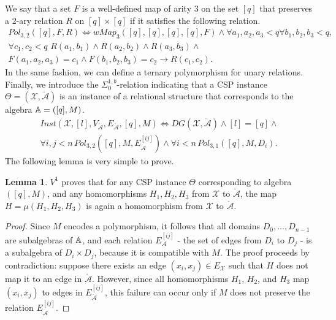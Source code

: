 \documentclass{article}
\newcommand{\A}{\ensuremath\mathbb{A}}
\theoremstyle{definition}
\theoremstyle{theorem}
\newtheorem{lem}{Lemma}
\theoremstyle{theorem}
\theoremstyle{remark}
\theoremstyle{remark}
\theoremstyle{example}
\theoremstyle{notation}
\theoremstyle{theorem}
\begin{document}
We say that a set $F$ is a well-defined map of arity $3$ on the set $[q]$ that preserves a $2$-ary relation $R$ on $[q] \times [q]$ if it satisfies the following relation.
\begin{equation}
 \begin{gathered}
 Pol_{3,2}([q], F, R) \iff wMap_3([q],[q],[q],[q],F) \wedge \forall a_1,a_2,a_3<q\forall b_1,b_2,b_3<q, \\
 \hspace{0pt}\forall c_1,c_2<q\,\,R(a_1,b_1)\wedge R(a_2,b_2) \wedge R(a_3,b_3) \wedge\\
 \hspace{0pt}F(a_1,a_2,a_3)=c_1\wedge F(b_1,b_2,b_3)=c_2 \rightarrow R(c_1,c_2).
 \end{gathered}
\end{equation}
In the same fashion, we can define a ternary polymorphism for unary relations. Finally, we introduce the $\Sigma^{1,b}_0$-relation indicating that a CSP instance $\Theta = (\mathcal{X}, \ddot{\mathcal{A}})$ is an instance of a relational structure that corresponds to the algebra $\A = ([q], M)$.
\begin{equation}
    \begin{gathered}
         Inst(\mathcal{X}, [l], V_{\ddot{\mathcal{A}}},E_{\ddot{\mathcal{A}}},[q], M)\iff DG(\mathcal{X},\ddot{\mathcal{A}})\wedge [l]=[q]\wedge\\
\forall i, j<n \,Pol_{3,2}([q],M,E^{[ij]}_{\ddot{\mathcal{A}}})\wedge \forall i<n \,Pol_{3,1}([q],M,D_i).
    \end{gathered}
\end{equation}
The following lemma is very simple to prove.
\begin{lem}\label{simplemm}
$V^1$ proves that for any CSP instance $\Theta$ corresponding to algebra $([q], M)$, and any homomorphisms $H_1, H_2, H_3$ from $\mathcal{X}$ to $\ddot{\mathcal{A}}$, the map $H = \mu(H_1, H_2, H_3)$ is again a homomorphism from $\mathcal{X}$ to $\ddot{\mathcal{A}}$.
\end{lem}
\begin{proof}
Since $M$ encodes a polymorphism, it follows that all domains $D_0, \ldots, D_{n-1}$ are subalgebras of $\A$, and each relation $E_{\mathcal{A}}^{[ij]}$ - the set of edges from $D_i$ to $D_j$ - is a subalgebra of $D_i \times D_j$, because it is compatible with $M$. The proof proceeds by contradiction: suppose there exists an edge $(x_i, x_j) \in E_{\mathcal{X}}$ such that $H$ does not map it to an edge in $\ddot{\mathcal{A}}$. However, since all homomorphisms $H_1$, $H_2$, and $H_3$ map $(x_i, x_j)$ to edges in $E^{[ij]}_{\ddot{\mathcal{A}}}$, this failure can occur only if $M$ does not preserve the relation $E^{[ij]}_{\ddot{\mathcal{A}}}$.
\end{proof}
\end{document}
